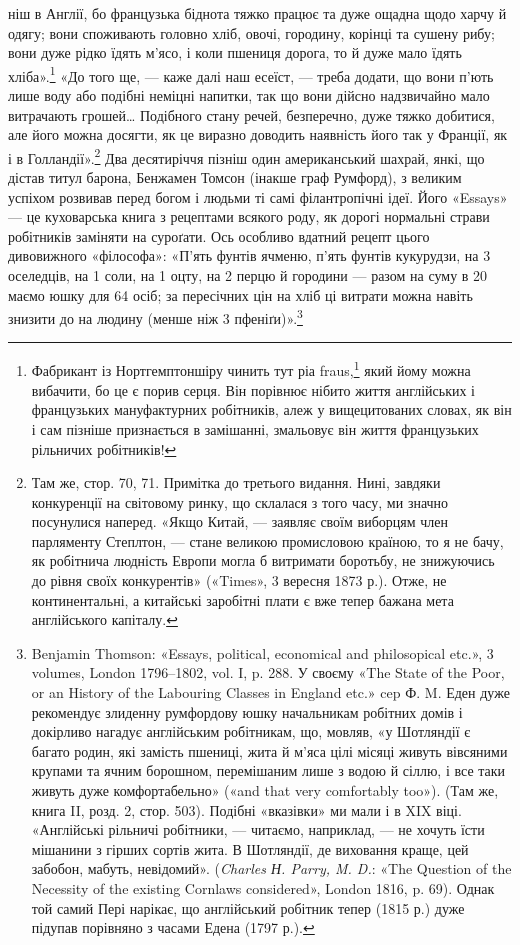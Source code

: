 \parcont{}  %
ніш в Англії, бо французька біднота тяжко працює та дуже
ощадна щодо харчу й одягу; вони споживають головно хліб,
овочі, городину, корінці та сушену рибу; вони дуже рідко їдять
м’ясо, і коли пшениця дорога, то й дуже мало їдять хліба».\footnote{
Фабрикант із Нортгемптоншіру чинить тут ріа fraus,\footnote*{
— благочестивий обман. \emph{Ред.}
} який йому
можна вибачити, бо це є порив серця. Він порівнює нібито життя англійських
і французьких мануфактурних робітників, алеж у вищецитованих
словах, як він і сам пізніше признається в замішанні, змальовує він
життя французьких рільничих робітників!
}
«До того ще, — каже далі наш есеїст, — треба додати, що вони
п’ють лише воду або подібні неміцні напитки, так що вони дійсно
надзвичайно мало витрачають грошей\dots{} Подібного стану речей,
безперечно, дуже тяжко добитися, але його можна досягти, як
це виразно доводить наявність його так у Франції, як і в Голландії».\footnote{
Там же, стор. 70, 71. Примітка до третього видання. Нині, завдяки
конкуренції на світовому ринку, що склалася з того часу, ми значно
посунулися наперед. «Якщо Китай, — заявляє своїм виборцям член парляменту
Степлтон, — стане великою промисловою країною, то я не бачу,
як робітнича людність Европи могла б витримати боротьбу, не знижуючись
до рівня своїх конкурентів» («Times», 3 вересня 1873 р.). Отже,
не континентальні, а китайські заробітні плати є вже тепер бажана
мета англійського капіталу.
} Два десятиріччя пізніш один американський шахрай,
янкі, що дістав титул барона, Бенжамен Томсон (інакше граф
Румфорд), з великим успіхом розвивав перед богом і людьми ті
самі філантропічні ідеї. Його «Essays» — це куховарська книга
з рецептами всякого роду, як дорогі нормальні страви робітників
заміняти на суроґати. Ось особливо вдатний рецепт цього
дивовижного «філософа»: «П’ять фунтів ячменю, п’ять фунтів
кукурудзи, на 3 оселедців, на 1 соли, на 1 оцту,
на 2 перцю й городини — разом на суму в 20
маємо юшку для 64 осіб; за пересічних цін на хліб ці витрати
можна навіть знизити до  на людину (менше ніж 3 пфеніґи)».\footnote{
Benjamin Thomson: «Essays, political, economical and philosopical
etc.», 3 volumes, London 1796--1802, vol. I, p. 288. У своєму «The
State of the Poor, or an History of the Labouring Classes in England etc.»
cep Ф. M. Еден дуже рекомендує злиденну румфордову юшку начальникам
робітних домів і докірливо нагадує англійським робітникам,
що, мовляв, «у Шотляндії є багато родин, які замість пшениці, жита й
м’яса цілі місяці живуть вівсяними крупами та ячним борошном, перемішаним
лише з водою й сіллю, і все таки живуть дуже комфортабельно»
(«and that very comfortably too»). (Там же, книга II, розд. 2, стор. 503).
Подібні «вказівки» ми мали і в XIX віці. «Англійські рільничі робітники,
— читаємо, наприклад, — не хочуть їсти мішанини з гірших сортів
жита. В Шотляндії, де виховання краще, цей забобон, мабуть, невідомий».
(\emph{Charles Н. Parry, M. D.}: «The Question of the Necessity of the
existing Cornlaws considered», London 1816, p. 69). Однак той самий
Пері нарікає, що англійський робітник тепер (1815 р.) дуже підупав
порівняно з часами Едена (1797 р.).
}
